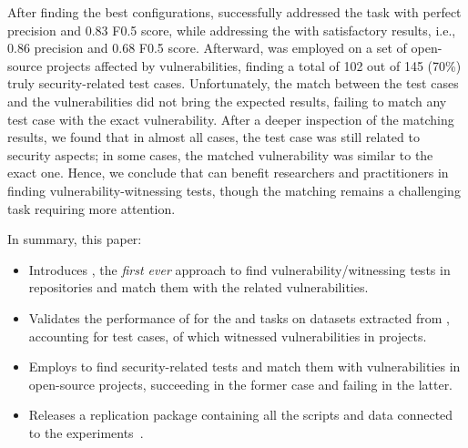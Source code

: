 After finding the best configurations, \vuteco successfully addressed the \finding task with perfect precision and 0.83 F0.5 score, while addressing the \matching with satisfactory results, i.e., 0.86 precision and 0.68 F0.5 score.
Afterward, \vuteco was employed on a set of \invivoProjects open-source \Java projects affected by \invivoVulns vulnerabilities, finding a total of 102 out of 145 (70\%) truly security-related test cases.
Unfortunately, the match between the test cases and the vulnerabilities did not bring the expected results, failing to match any test case with the exact vulnerability.
After a deeper inspection of the matching results, we found that in almost all cases, the test case was still related to security aspects; in some cases, the matched vulnerability was similar to the exact one.
%
Hence, we conclude that \vuteco can benefit researchers and practitioners in finding vulnerability-witnessing tests, though the matching remains a challenging task requiring more attention.

In summary, this paper:
\begin{itemize}[leftmargin=*]
    \item Introduces \vuteco, the \textit{first ever} approach to find vulnerability\-/witnessing tests in \Java repositories and match them with the related vulnerabilities.
    \item Validates the performance of \vuteco for the \finding and \matching tasks on datasets extracted from \VulforJ, accounting for \vulforjTests test cases, of which \vulforjWitTests witnessed \vulforjVulns vulnerabilities in \vulforjProjects \Java projects.
    \item Employs \vuteco to find security-related tests and match them with vulnerabilities in \invivoProjects open-source \Java projects, succeeding in the former case and failing in the latter.
    \item Releases a replication package containing all the scripts and data connected to the experiments~\cite{appendix}.
\end{itemize}

